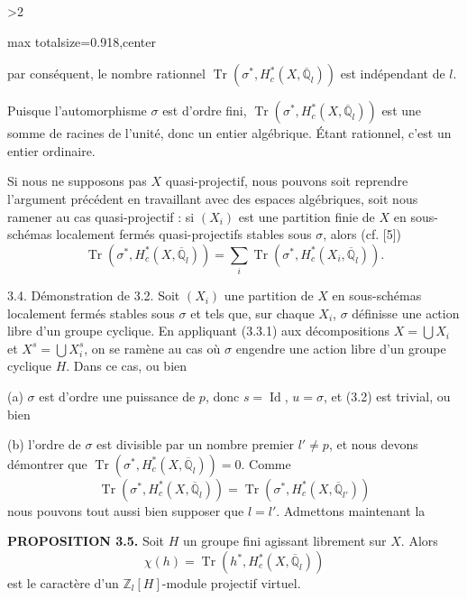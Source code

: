 \documentclass[9pt,twoside]{extarticle}
\newcommand{\EditionPage}[3]{%
  \ifnum#1>2\clearpage\fi
  \pdfbookmark[1]{Printed page #2}{fr-folio-#2}%
  \hypertarget{fr-physical-#1}{}%
  \noindent\begin{adjustbox}{max totalsize={\textwidth}{0.918\textheight},center}
  \begin{minipage}[t]{\textwidth}
  \fontsize{9.4}{11.1}\selectfont\justifying
  #3
  \end{minipage}
  \end{adjustbox}%
}
\begin{document}
\EditionPage{19}{120}{%
par conséquent, le nombre rationnel \(\operatorname{Tr}(\sigma^*,H_c^*(X,\overline{\mathbb Q}_l))\) est indépendant de \(l\).\par

Puisque l'automorphisme \(\sigma\) est d'ordre fini, \(\operatorname{Tr}(\sigma^*,H_c^*(X,\overline{\mathbb Q}_l))\) est une somme de racines de l'unité, donc un entier algébrique. Étant rationnel, c'est un entier ordinaire.\par

Si nous ne supposons pas \(X\) quasi-projectif, nous pouvons soit reprendre l'argument précédent en travaillant avec des espaces algébriques, soit nous ramener au cas quasi-projectif : si \((X_i)\) est une partition finie de \(X\) en sous-schémas localement fermés quasi-projectifs stables sous \(\sigma\), alors (cf. [5]) \[
\tag{3.3.1}
\operatorname{Tr}(\sigma^*,H_c^*(X,\overline{\mathbb Q}_l))
=
\sum_i\operatorname{Tr}(\sigma^*,H_c^*(X_i,\overline{\mathbb Q}_l)).
\]\par

3.4. Démonstration de 3.2. Soit \((X_i)\) une partition de \(X\) en sous-schémas localement fermés stables sous \(\sigma\) et tels que, sur chaque \(X_i\), \(\sigma\) définisse une action libre d'un groupe cyclique. En appliquant (3.3.1) aux décompositions \(X=\bigcup X_i\) et \(X^s=\bigcup X_i^s\), on se ramène au cas où \(\sigma\) engendre une action libre d'un groupe cyclique \(H\). Dans ce cas, ou bien\par

(a) \(\sigma\) est d'ordre une puissance de \(p\), donc \(s=\operatorname{Id}\), \(u=\sigma\), et (3.2) est trivial, ou bien\par

(b) l'ordre de \(\sigma\) est divisible par un nombre premier \(l'\ne p\), et nous devons démontrer que \(\operatorname{Tr}(\sigma^*,H_c^*(X,\overline{\mathbb Q}_l))=0\). Comme \[
\operatorname{Tr}(\sigma^*,H_c^*(X,\overline{\mathbb Q}_l))
=
\operatorname{Tr}(\sigma^*,H_c^*(X,\overline{\mathbb Q}_{l'}))
\tag{3.3}
\] nous pouvons tout aussi bien supposer que \(l=l'\). Admettons maintenant la\par

\noindent\textbf{PROPOSITION 3.5.} Soit \(H\) un groupe fini agissant librement sur \(X\). Alors \[
\chi(h)=\operatorname{Tr}(h^*,H_c^*(X,\overline{\mathbb Q}_l))
\] est le caractère d'un \(\mathbb Z_l[H]\)-module projectif virtuel.\par

}
\end{document}
